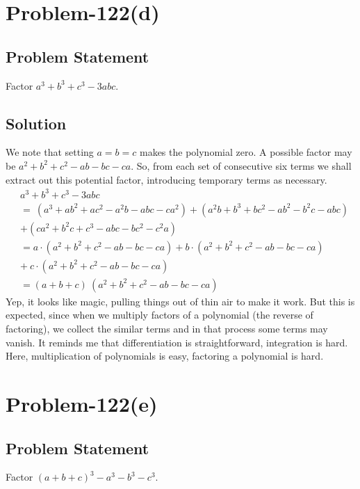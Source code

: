 \documentclass[12pt]{article}
\begin{document}
\section*{Problem-122(d)}
\subsection*{Problem Statement}
Factor $a^3 + b^3 + c^3 -3abc$.
\subsection*{Solution}
We note that setting $a=b=c$ makes the polynomial zero. A possible factor may be $a^2+b^2+c^2-ab-bc-ca$. So, from each set of consecutive six terms we shall extract out this potential factor, introducing temporary terms as necessary.
\begin{equation*}
	\begin{aligned}
		& a^3 + b^3 + c^3 -3abc\\
		&=\ \left(a^3+ab^2+ac^2-a^2b-abc-ca^2\right) + \left( a^2b+b^3+bc^2-ab^2-b^2c-abc \right) \\
		&+ \left( ca^2 + b^2c + c^3 - abc - bc^2 - c^2a \right)\\
		&= a\cdot \left( a^2+b^2+c^2-ab-bc-ca \right) + b\cdot \left( a^2+b^2+c^2-ab-bc-ca \right)\\
		&+\ c\cdot \left( a^2+b^2+c^2-ab-bc-ca \right)\\
		&= (a+b+c)\ \left( a^2+b^2+c^2-ab-bc-ca \right)
	\end{aligned}
\end{equation*}
Yep, it looks like magic, pulling things out of thin air to make it work. But this is expected, since when we multiply factors of a polynomial (the reverse of factoring), we collect the similar terms and in that process some terms may vanish. It reminds me that differentiation is straightforward, integration is hard. Here, multiplication of polynomials is easy, factoring a polynomial is hard.

\section*{Problem-122(e)}
\subsection*{Problem Statement}
Factor $(a+b+c)^3 -a^3-b^3-c^3$.
\end{document}
